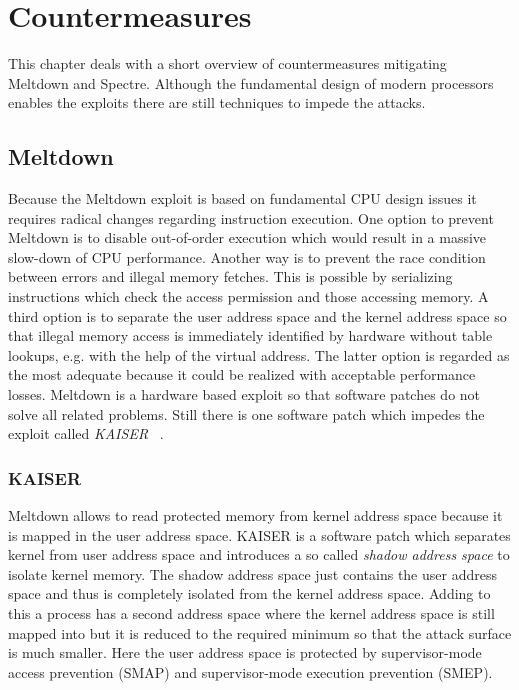 \documentclass[a4paper,oneside,openright] {scrreprt}
\begin{document}
\chapter{Countermeasures}
\label{ch:countermeasures}

This chapter deals with a short overview of countermeasures mitigating Meltdown and Spectre. 
Although the fundamental design of modern processors enables the exploits there are still techniques to impede
the attacks.

\section{Meltdown}
\label{ch:intro:motivation}

Because the Meltdown exploit is based on fundamental CPU design issues it requires radical changes regarding instruction execution.
One option to prevent Meltdown is to disable out-of-order execution which would result in a massive slow-down of CPU performance.
Another way is to prevent the race condition between errors and illegal memory fetches. This is possible by serializing instructions
which check the access permission and those accessing memory.
A third option is to separate the user address space and the kernel address space so that illegal memory access is immediately
identified by hardware without table lookups, e.g. with the help of the virtual address.
The latter option is regarded as the most adequate because it could be realized with acceptable performance losses.
Meltdown is a hardware based exploit so that software patches do not solve all related problems. 
Still there is one software patch which impedes the exploit called \textit{KAISER} ~\cite{gruss2017kaslr}.

\subsection{KAISER}
\label{ch:intro:motivation}

Meltdown allows to read protected memory from kernel address space because it is mapped in the user address space.
KAISER is a software patch which separates kernel from user address space and introduces a so called \textit{shadow address space}
to isolate kernel memory. 
The shadow address space just contains the user address space and thus is completely isolated from the kernel address space.
Adding to this a process has a second address space where the kernel address space is still mapped into 
but it is reduced to the required minimum so that the attack surface is much smaller. 
Here the user address space is protected by supervisor-mode access prevention (SMAP) 
and supervisor-mode execution prevention (SMEP).
\end{document}
